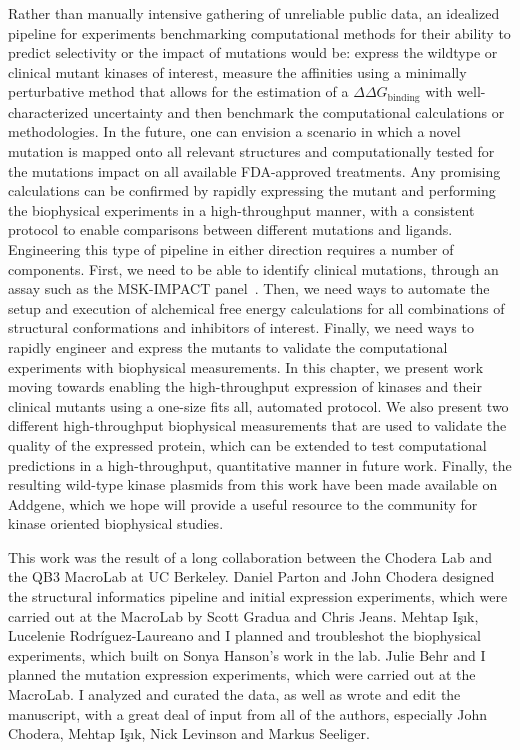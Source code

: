 \documentclass[phd,tocprelim]{cornell}
\begin{document}
Rather than manually intensive gathering of unreliable public data, an idealized pipeline for experiments benchmarking computational methods for their ability to predict selectivity or the impact of mutations would be: express the wildtype or clinical mutant kinases of interest, measure the affinities using a minimally perturbative method that allows for the estimation of a $\Delta \Delta G_{\text{binding}}$ with well-characterized uncertainty and then benchmark the computational calculations or methodologies. In the future, one can envision a scenario in which a novel mutation is mapped onto all relevant structures and computationally tested for the mutations impact on all available FDA-approved treatments. Any promising calculations can be confirmed by rapidly expressing the mutant and performing the biophysical experiments in a high-throughput manner, with a consistent protocol to enable comparisons between different mutations and ligands. Engineering this type of pipeline in either direction requires a number of components. First, we need to be able to identify clinical mutations, through an assay such as the MSK-IMPACT panel~\citep{Zehir:2017ib}. Then, we need ways to automate the setup and execution of alchemical free energy calculations for all combinations of structural conformations and inhibitors of interest. Finally, we need ways to rapidly engineer and express the mutants to validate the computational experiments with biophysical measurements. In this chapter, we present work moving towards enabling the high-throughput expression of kinases and their clinical mutants using a one-size fits all, automated protocol. We also present two different high-throughput biophysical measurements that are used to validate the quality of the expressed protein, which can be extended to test computational predictions in a high-throughput, quantitative manner in future work. Finally, the resulting wild-type kinase plasmids from this work have been made available on Addgene, which we hope will provide a useful resource to the community for kinase oriented biophysical studies. 

This work was the result of a long collaboration between the Chodera Lab and the QB3 MacroLab at UC Berkeley. Daniel Parton and John Chodera designed the structural informatics pipeline and initial expression experiments, which were carried out at the MacroLab by Scott Gradua and Chris Jeans. Mehtap Işık, Lucelenie Rodr\'{i}guez-Laureano and I planned and troubleshot the biophysical experiments, which built on Sonya Hanson's work in the lab. Julie Behr and I planned the mutation expression experiments, which were carried out at the MacroLab. I analyzed and curated the data, as well as wrote and edit the manuscript, with a great deal of input from all of the authors, especially John Chodera, Mehtap Işık, Nick Levinson and Markus Seeliger. 
\end{document}
